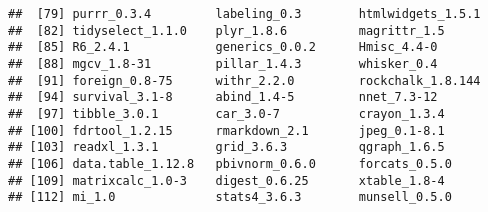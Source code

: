 \documentclass[
]{article}
\begin{document}
\begin{verbatim}
##  [79] purrr_0.3.4         labeling_0.3        htmlwidgets_1.5.1  
##  [82] tidyselect_1.1.0    plyr_1.8.6          magrittr_1.5       
##  [85] R6_2.4.1            generics_0.0.2      Hmisc_4.4-0        
##  [88] mgcv_1.8-31         pillar_1.4.3        whisker_0.4        
##  [91] foreign_0.8-75      withr_2.2.0         rockchalk_1.8.144  
##  [94] survival_3.1-8      abind_1.4-5         nnet_7.3-12        
##  [97] tibble_3.0.1        car_3.0-7           crayon_1.3.4       
## [100] fdrtool_1.2.15      rmarkdown_2.1       jpeg_0.1-8.1       
## [103] readxl_1.3.1        grid_3.6.3          qgraph_1.6.5       
## [106] data.table_1.12.8   pbivnorm_0.6.0      forcats_0.5.0      
## [109] matrixcalc_1.0-3    digest_0.6.25       xtable_1.8-4       
## [112] mi_1.0              stats4_3.6.3        munsell_0.5.0
\end{verbatim}
\end{document}
